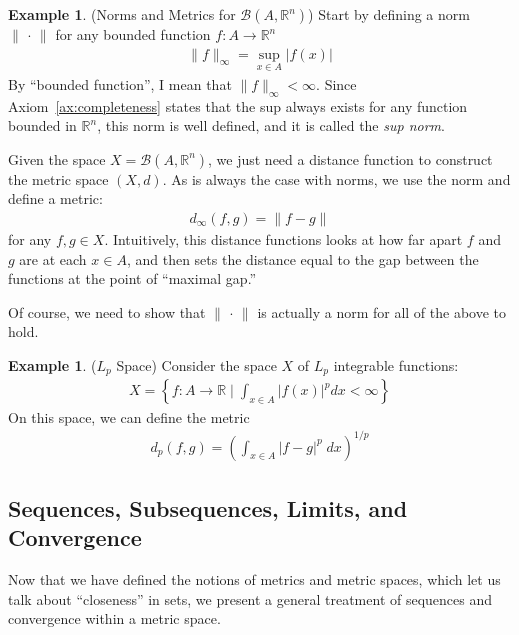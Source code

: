 \documentclass[12pt]{article}
\numberwithin{equation}{section} %
\theoremstyle{plain}
\theoremstyle{definition}
\newtheorem{ex}[thm]{Example}
\theoremstyle{remark}
\newcommand{\R}{\mathbb{R}}
\begin{document}
\begin{ex}{(Norms and Metrics for $\mathscr{B}(A,\R^n)$)}
Start by defining a norm $\lVert \,\cdot\,\rVert$ for any bounded
function $f:A \rightarrow \R^n$
\begin{align*}
  \lVert f\rVert_\infty
  = \sup_{x\in A} |f(x)|
\end{align*}
By ``bounded function'', I mean that $\lVert f\rVert_\infty<\infty$.
Since Axiom~\ref{ax:completeness} states that the sup always exists for
any function bounded in $\R^n$, this norm is well defined, and it is
called the \emph{sup norm}.

Given the space $X=\mathscr{B}(A,\R^n)$, we just need a distance
function to construct the metric space $(X,d)$. As is always the case
with norms, we use the norm and define a metric:
\begin{align*}
  d_\infty(f,g) = \lVert f-g\rVert
\end{align*}
for any $f,g\in X$. Intuitively, this distance functions looks at how
far apart $f$ and $g$ are at each $x\in A$, and then sets the distance
equal to the gap between the functions at the point of ``maximal gap.''

Of course, we need to show that $\lVert \,\cdot\,\rVert$ is actually a
norm for all of the above to hold.
\end{ex}

\begin{ex}{($L_p$ Space)}
Consider the space $X$ of $L_p$ integrable functions:
\begin{align*}
  X = \left\{
    f:A\rightarrow \R \; \big|\;
    \int_{x\in A} |f(x)|^p dx <\infty
  \right\}
\end{align*}
On this space, we can define the metric
\begin{align*}
  d_p(f,g) = \left(\int_{x\in A} |f-g|^p \; dx\right)^{1/p}
\end{align*}
\end{ex}

\clearpage
\subsection{Sequences, Subsequences, Limits, and Convergence}

Now that we have defined the notions of metrics and metric spaces, which
let us talk about ``closeness'' in sets, we present a general treatment
of sequences and convergence within a metric space.
\end{document}
